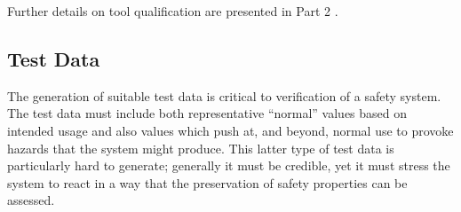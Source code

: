 

Further details on tool qualification are presented in Part 2 .

\subsection{Test Data}
The generation of suitable test data is critical to verification of a safety system. The test data must include both representative ``normal'' values based on intended usage and also values which push at, and beyond, normal use to provoke \glspl{hazard} that the system might produce. This latter type of test data is particularly hard to generate; generally it must be credible, yet it must stress the system to react in a way that the preservation of safety properties can be assessed. 

